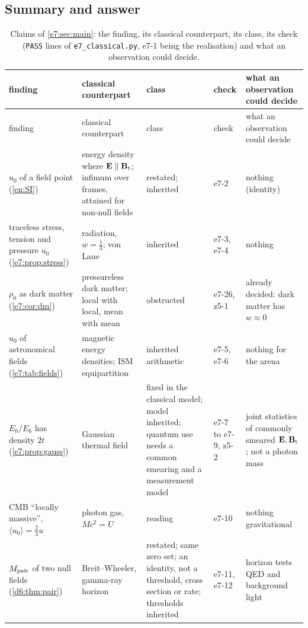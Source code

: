 \subsection{Summary and answer}
\label{e7:sec:summary}

{\footnotesize
\begin{longtable}{@{}>{\raggedright\arraybackslash}p{3.4cm}>{\raggedright\arraybackslash}p{3.2cm}>{\raggedright\arraybackslash}p{2.6cm}>{\raggedright\arraybackslash}p{1.5cm}>{\raggedright\arraybackslash}p{3.5cm}@{}}
\caption{Claims of \cref{e7:sec:main}: the finding, its classical counterpart, its class, its check (\texttt{PASS} lines of
\texttt{e7\_classical.py}, e7-1 being the realisation) and what an observation could decide. }
\label{e7:tab:claims}\\
\toprule
finding & classical counterpart & class & check & what an observation could decide\\
\midrule
\endfirsthead
\toprule
finding & classical counterpart & class & check & what an observation could decide\\
\midrule
\endhead
\bottomrule
\endfoot
$u_0$ of a field point (\cref{en:SI}) & energy density where $\mathbf E\parallel\mathbf B_{\rm t}$; infimum over frames, attained for non-null fields & restated; inherited & e7-2 & nothing (identity)\\
traceless stress, tension and pressure $u_0$ (\cref{e7:prop:stress}) & radiation, $w=\tfrac13$; von Laue & inherited & e7-3, e7-4 & nothing\\
$\rho_0$ as dark matter (\cref{e7:cor:dm}) & pressureless dark matter; local with local, mean with mean & obstructed & e7-26, z5-1 & already decided: dark matter has $w\approx0$\\
$u_0$ of astronomical fields (\cref{e7:tab:fields}) & magnetic energy densities; ISM equipartition & inherited arithmetic & e7-5, e7-6 & nothing for the arena\\
$E_0/E_6$ has density $2t$ (\cref{e7:prop:gauss}) & Gaussian thermal field & fixed in the classical model; model inherited; quantum use needs a common smearing and a measurement model & e7-7 to e7-9, z5-2 & joint statistics of commonly smeared $\mathbf E,\mathbf B_{\rm t}$; not a photon mass\\
CMB ``locally massive'', $\langle u_0\rangle=\tfrac23u$ & photon gas, $Mc^2=U$ & reading & e7-10 & nothing gravitational\\
$M_{\rm pair}$ of two null fields (\cref{d6:thm:pair}) & Breit--Wheeler, gamma-ray horizon & restated; same zero set; an identity, not a threshold, cross section or rate; thresholds inherited & e7-11, e7-12 & horizon tests QED and background light\\

\end{longtable}}
